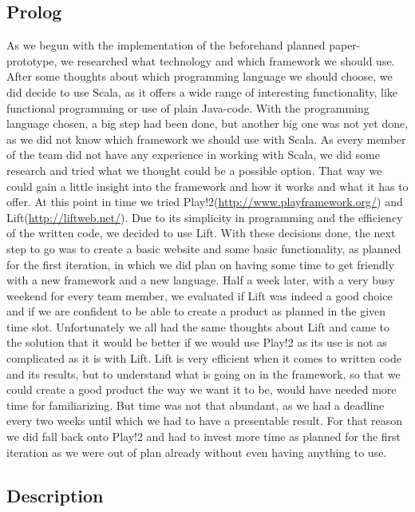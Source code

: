 \subsection{Prolog}\label{ssec:WebProlog}

As we begun with the implementation of the beforehand planned paper-prototype, we researched what technology and which
framework we should use.
After some thoughts about which programming language we should choose, we did decide to use Scala, as it offers a wide range of
interesting functionality, like functional programming or use of plain Java-code.
With the programming language chosen, a big step had been done, but another big one was not yet done, as we did not know which
framework we should use with Scala. As every member of the team did not have any experience in working with Scala, we did some
research and tried what we thought could be a possible option. That way we could gain a little insight into the framework and how
it works and what it has to offer. At this point in time we tried Play!2(\url{http://www.playframework.org/}) and
Lift(\url{http://liftweb.net/}). Due to its simplicity in programming and the efficiency of the written code, we decided to use
Lift.\newline
With these decisions done, the next step to go was to create a basic website and some basic functionality, as planned for the
first iteration, in which we did plan on having some time to get friendly with a new framework and a new language.
Half a week later, with a very busy weekend for every team member, we evaluated if Lift was indeed a good choice and if we are
confident to be able to create a product as planned in the given time slot.
Unfortunately we all had the same thoughts about Lift and came to the solution that it would be better if we would use Play!2 as
its use is not as complicated as it is with Lift. Lift is very efficient when it comes to written code and its results, but to
understand what is going on in the framework, so that we could create a good product the way we want it to be, would have needed
more time for familiarizing. But time was not that abundant, as we had a deadline every two weeks until which we had to have a
presentable result.
For that reason we did fall back onto Play!2 and had to invest more time as planned for the first iteration as we were out of
plan already without even having anything to use.

\subsection{Description}\label{ssec:WebDesc}

